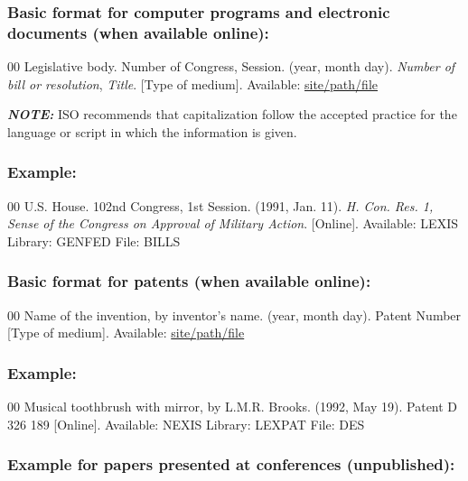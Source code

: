 \subsubsection*{Basic format for computer programs and electronic documents (when available online): }

\begin{thebibliography}{00}
 Legislative body. Number of Congress, Session. (year, month day). \textit{Number of bill or resolution}, \textit{Title}. [Type
of medium]. Available: \underline{site/path/file}
\end{thebibliography}

{\bfseries\itshape NOTE:} ISO recommends that capitalization follow the
accepted practice for the language or script in which the information is
given.

\subsubsection*{Example:}

\begin{thebibliography}{00}
 U.S. House. 102nd Congress, 1st Session. (1991, Jan. 11). \textit{H. Con. Res. 1, Sense of the Congress on Approval of Military Action}. [Online]. Available: LEXIS Library: GENFED File: BILLS
\end{thebibliography}

\subsubsection*{Basic format for patents (when available online):}

\begin{thebibliography}{00}
 Name of the invention, by inventor's name. (year, month day). Patent Number [Type
of medium]. Available: \underline{site/path/file}
\end{thebibliography}

\subsubsection*{Example:}

\begin{thebibliography}{00}
 Musical toothbrush with mirror, by L.M.R. Brooks. (1992, May 19). Patent D 326 189 [Online]. Available: NEXIS Library: LEXPAT File: DES
\end{thebibliography}

\subsubsection*{Example for papers presented at conferences (unpublished):}

